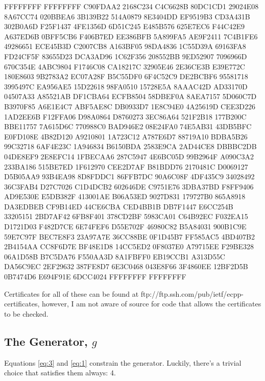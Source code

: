 \documentclass[a4paper,titlepage]{article}
\begin{document}
\begin{tt}
        FFFFFFFF FFFFFFFF C90FDAA2 2168C234 C4C6628B 80DC1CD1
        29024E08 8A67CC74 020BBEA6 3B139B22 514A0879 8E3404DD
        EF9519B3 CD3A431B 302B0A6D F25F1437 4FE1356D 6D51C245
        E485B576 625E7EC6 F44C42E9 A637ED6B 0BFF5CB6 F406B7ED
        EE386BFB 5A899FA5 AE9F2411 7C4B1FE6 49286651 ECE45B3D
        C2007CB8 A163BF05 98DA4836 1C55D39A 69163FA8 FD24CF5F
        83655D23 DCA3AD96 1C62F356 208552BB 9ED52907 7096966D
        670C354E 4ABC9804 F1746C08 CA18217C 32905E46 2E36CE3B
        E39E772C 180E8603 9B2783A2 EC07A28F B5C55DF0 6F4C52C9
        DE2BCBF6 95581718 3995497C EA956AE5 15D22618 98FA0510
        15728E5A 8AAAC42D AD33170D 04507A33 A85521AB DF1CBA64
        ECFB8504 58DBEF0A 8AEA7157 5D060C7D B3970F85 A6E1E4C7
        ABF5AE8C DB0933D7 1E8C94E0 4A25619D CEE3D226 1AD2EE6B
        F12FFA06 D98A0864 D8760273 3EC86A64 521F2B18 177B200C
        BBE11757 7A615D6C 770988C0 BAD946E2 08E24FA0 74E5AB31
        43DB5BFC E0FD108E 4B82D120 A9210801 1A723C12 A787E6D7
        88719A10 BDBA5B26 99C32718 6AF4E23C 1A946834 B6150BDA
        2583E9CA 2AD44CE8 DBBBC2DB 04DE8EF9 2E8EFC14 1FBECAA6
        287C5947 4E6BC05D 99B2964F A090C3A2 233BA186 515BE7ED
        1F612970 CEE2D7AF B81BDD76 2170481C D0069127 D5B05AA9
        93B4EA98 8D8FDDC1 86FFB7DC 90A6C08F 4DF435C9 34028492
        36C3FAB4 D27C7026 C1D4DCB2 602646DE C9751E76 3DBA37BD
        F8FF9406 AD9E530E E5DB382F 413001AE B06A53ED 9027D831
        179727B0 865A8918 DA3EDBEB CF9B14ED 44CE6CBA CED4BB1B
        DB7F1447 E6CC254B 33205151 2BD7AF42 6FB8F401 378CD2BF
        5983CA01 C64B92EC F032EA15 D1721D03 F482D7CE 6E74FEF6
        D55E702F 46980C82 B5A84031 900B1C9E 59E7C97F BEC7E8F3
        23A97A7E 36CC88BE 0F1D45B7 FF585AC5 4BD407B2 2B4154AA
        CC8F6D7E BF48E1D8 14CC5ED2 0F8037E0 A79715EE F29BE328
        06A1D58B B7C5DA76 F550AA3D 8A1FBFF0 EB19CCB1 A313D55C
        DA56C9EC 2EF29632 387FE8D7 6E3C0468 043E8F66 3F4860EE
        12BF2D5B 0B7474D6 E694F91E 6DCC4024 FFFFFFFF FFFFFFFF
\end{tt}

Certificates for all of these can be found at
ftp://ftp.ssh.com/pub/ietf/ecpp-certificates, however, I am not aware
of source for code that allows the certificates to be checked.

\subsection{The Generator, $g$}

Equations \ref{eq:3} and \ref{eq:1} constrain the generator. Luckily,
there's a trivial choice that satisfies them always: 4.
\end{document}
